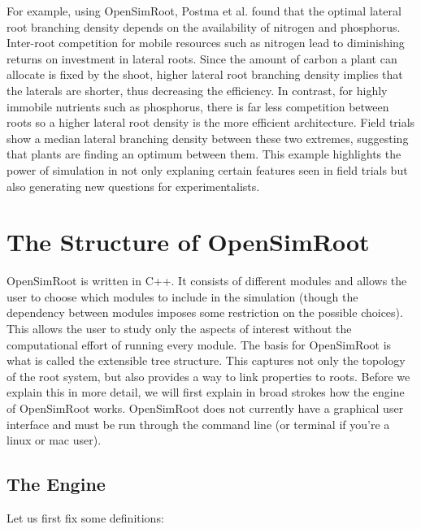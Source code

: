 \documentclass{article}
\begin{document}
\noindent For example, using OpenSimRoot, Postma et al. \cite{Postma2014} found that the optimal lateral root branching density depends on the availability of nitrogen and phosphorus. Inter-root competition for mobile resources such as nitrogen lead to diminishing returns on investment in lateral roots. Since the amount of carbon a plant can allocate is fixed by the shoot, higher lateral root branching density implies that the laterals are shorter, thus decreasing the efficiency. In contrast, for highly immobile nutrients such as phosphorus, there is far less competition between roots so a higher lateral root density is the more efficient architecture. Field trials show a median lateral branching density between these two extremes, suggesting that plants are finding an optimum between them. This example highlights the power of simulation in not only explaning certain features seen in field trials but also generating new questions for experimentalists. \newline

\section{The Structure of OpenSimRoot}

\noindent OpenSimRoot is written in C++. It consists of different modules and allows the user to choose which modules to include in the simulation (though the dependency between modules imposes some restriction on the possible choices). This allows the user to study only the aspects of interest without the computational effort of running every module. The basis for OpenSimRoot is what is called the extensible tree structure. This captures not only the topology of the root system, but also provides a way to link properties to roots. Before we explain this in more detail, we will first explain in broad strokes how the engine of OpenSimRoot works. OpenSimRoot does not currently have a graphical user interface and must be run through the command line (or terminal if you're a linux or mac user).

\subsection{The Engine}\label{Engine}

\noindent Let us first fix some definitions:
\end{document}
